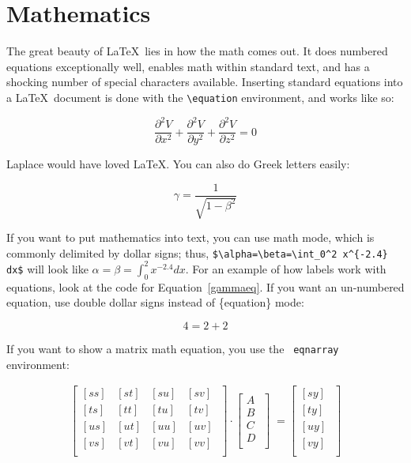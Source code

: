\documentclass[12pt,preprint]{aastex}
\begin{document}
\section{Mathematics}\label{mathsec}

        The great beauty of \LaTeX\ lies in how the math comes out.  It
does numbered equations exceptionally well, enables math within standard
text, and has a shocking number of special characters available. 
Inserting standard equations into a \LaTeX\ document is done with the
\verb&\equation& environment, and works like so:

\begin{equation} \label{laplacian}
\frac{\partial^2 V} {\partial x^2}+\frac{\partial^2 V}
{\partial y^2} + \frac{\partial^2 V}{\partial z^2}=0
\end{equation}

Laplace would have loved \LaTeX.  You can also do Greek letters easily:

\begin{equation} \label{gammaeq}
\gamma=\frac{1}{\sqrt{1-\beta^2}}
\end{equation}

\noindent If you want to put mathematics into text, you can use math
mode, which is commonly delimited by dollar signs; thus,
\verb&$\alpha=\beta=\int_0^2 x^{-2.4} dx$& will look like
$\alpha=\beta=\int_0^2 x^{-2.4} dx$.  For an example of how labels work
with equations, look at the code for Equation~\ref{gammaeq}. If you want
an un-numbered equation, use double dollar signs instead of \{equation\}
mode:

$$     4 = 2 + 2  $$

\noindent If you want to show a matrix math equation, you use the {\tt
  eqnarray} environment:

\begin{eqnarray} \label{smeqn}
\left[
\begin{array}{cccc}
{[ ss ]} & {[ st ]} & {[ su ]} & {[ sv ]} \\
{[ ts ]} & {[ tt ]} & {[ tu ]} & {[ tv ]} \\
{[ us ]} & {[ ut ]} & {[ uu ]} & {[ uv ]} \\
{[ vs ]} & {[ vt ]} & {[ vu ]} & {[ vv ]} \\
\end{array}
\; \right] 
\cdot
\left[
\begin{array}{c}
A \\
B \\
C \\
D \\
\end{array}
\; \right]
\; =
\left[
\begin{array}{c}
{[ s y ]} \\
{[ t y ]} \\
{[ u y ]} \\
{[ v y ]} \\
\end{array}
\; \right]
\end{eqnarray}
\end{document}
